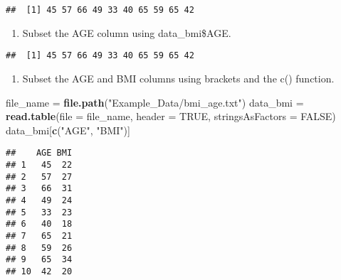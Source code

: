 \documentclass[]{article}
\newenvironment{Shaded}{\begin{snugshade}}{\end{snugshade}}
\newcommand{\DataTypeTok}[1]{\textcolor[rgb]{0.13,0.29,0.53}{#1}}
\newcommand{\KeywordTok}[1]{\textcolor[rgb]{0.13,0.29,0.53}{\textbf{#1}}}
\newcommand{\NormalTok}[1]{#1}
\newcommand{\OperatorTok}[1]{\textcolor[rgb]{0.81,0.36,0.00}{\textbf{#1}}}
\newcommand{\OtherTok}[1]{\textcolor[rgb]{0.56,0.35,0.01}{#1}}
\newcommand{\StringTok}[1]{\textcolor[rgb]{0.31,0.60,0.02}{#1}}
\providecommand{\tightlist}{%
  \setlength{\itemsep}{0pt}\setlength{\parskip}{0pt}}
\begin{document}
\begin{verbatim}
##  [1] 45 57 66 49 33 40 65 59 65 42
\end{verbatim}

\begin{enumerate}
\def\labelenumi{\alph{enumi}.}
\setcounter{enumi}{2}
\tightlist
\item
  Subset the AGE column using data\_bmi\$AGE.
\end{enumerate}

\begin{Shaded}
\end{Shaded}

\begin{verbatim}
##  [1] 45 57 66 49 33 40 65 59 65 42
\end{verbatim}

\begin{enumerate}
\def\labelenumi{\alph{enumi}.}
\setcounter{enumi}{3}
\tightlist
\item
  Subset the AGE and BMI columns using brackets and the c() function.
\end{enumerate}

\begin{Shaded}
\begin{Highlighting}[]
\NormalTok{file_name =}\StringTok{ }\KeywordTok{file.path}\NormalTok{(}\StringTok{"Example_Data/bmi_age.txt"}\NormalTok{)}
\NormalTok{data_bmi =}\StringTok{ }\KeywordTok{read.table}\NormalTok{(}\DataTypeTok{file =}\NormalTok{ file_name, }\DataTypeTok{header =} \OtherTok{TRUE}\NormalTok{, }\DataTypeTok{stringsAsFactors =} \OtherTok{FALSE}\NormalTok{)}
\NormalTok{data_bmi[}\KeywordTok{c}\NormalTok{(}\StringTok{"AGE"}\NormalTok{, }\StringTok{"BMI"}\NormalTok{)]}
\end{Highlighting}
\end{Shaded}

\begin{verbatim}
##    AGE BMI
## 1   45  22
## 2   57  27
## 3   66  31
## 4   49  24
## 5   33  23
## 6   40  18
## 7   65  21
## 8   59  26
## 9   65  34
## 10  42  20
\end{verbatim}
\end{document}
